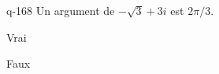 \begin{truefalse}{q-168}
Un argument de $-\sqrt{3}+3i$ est $2\pi/3$.
\item* Vrai
\item Faux
\end{truefalse}

